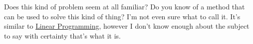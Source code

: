 \documentclass[11pt]{article}
\begin{document}
Does this kind of problem seem at all familiar? Do you know of a method that can
be used to solve this kind of thing? I'm not even sure what to call it. It's
similar to {\color{blue}\href{https://en.wikipedia.org/wiki/Linear_Programming}
  {Linear Programming}}, however I don't know enough about the subject to say
with certainty that's what it is.




\end{document}
